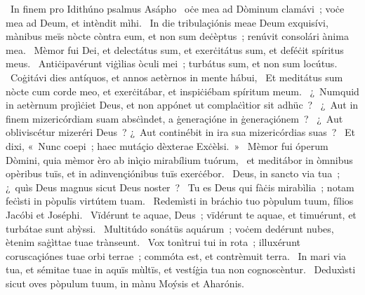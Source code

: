 {~In finem pro Idithúno psalmus Asápho}
{%
~oċe mea ad Dòminum clamávi~; voċe mea ad Deum, et intèndit mìhi.
~In die tribulaçiónis meae Deum exquisívi, mànibus meïs nòcte còntra eum, et non sum deċèptus~; renúvit consolári ànima mea.
~Mèmor fui Dei, et delectátus sum, et exerċitátus sum, et deféċit spíritus meus.
~Antiċipavérunt viġìlias òculi mei~; turbátus sum, et non sum locútus.
~Coġitávi dies antíquos, et annos aetèrnos in mente hábui,
~Et meditátus sum nòcte cum corde meo, et exerċitábar, et inspiċiébam spíritum meum.
~¿~Numquid in aetèrnum projìċiet Deus, et non appónet ut complaċìtior sit adhüc~?
~¿~Aut in finem mizericórdiam suam absċìndet, a ġeneraçióne in ġeneraçiónem~?
~¿~Aut obliviscétur mizeréri Deus~? ¿~Aut continébit in ira sua mizericórdias suas~?
~Et dixi, «~Nunc coepi~; haec mutáçio dèxterae Exċèlsi.~»
~Mèmor fui óperum Dòmini, quia mèmor èro ab inìçio mirabílium tuórum,
~et meditábor in òmnibus opèribus tuïs, et in adinvençiónibus tuïs exerċébor.
~Deus, in sancto via tua~; ¿~quìs Deus magnus sicut Deus noster~?
~Tu es Deus qui fàċis mirabìlia~; notam feċìsti in pòpulïs virtútem tuam.
~Redemìsti in bráchio tuo pòpulum tuum, fílios Jacóbi et Joséphi.
~Vïdérunt te aquae, Deus~; vïdérunt te aquae, et timuérunt, et turbátae sunt abỳssi.
~Multitúdo sonátüs aquárum~; voċem dedérunt nubes, ètenim saġìttae tuae trànseunt.
~Vox tonìtrui tui in rota~; illuxérunt coruscaçiónes tuae orbi terrae~; commóta est, et contrèmuit terra.
~In mari via tua, et sémitae tuae in aquïs mùltïs, et vestíġia tua non cognoscèntur.
~Deduxìsti sicut oves pòpulum tuum, in mànu Moýsis et Aharónis.}
